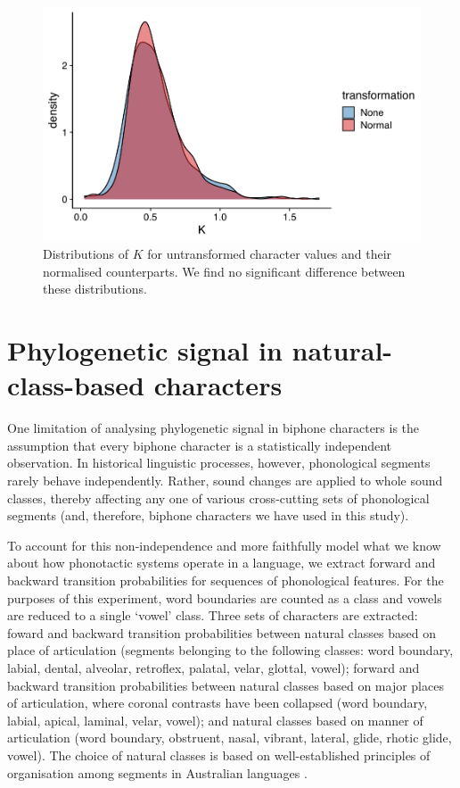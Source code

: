 \begin{figure}

{\centering \includegraphics[width=0.66\linewidth]{05-phylo-signal/fig/k-orig-norm} 

}

\caption{Distributions of $K$ for untransformed character values and their normalised counterparts. We find no significant difference between these distributions.}\label{fig:orig-vs-nrmlzd}
\end{figure}

\hypertarget{phy-sig-classes}{%
\section{Phylogenetic signal in natural-class-based characters}\label{phy-sig-classes}}

One limitation of analysing phylogenetic signal in biphone characters is the assumption that every biphone character is a statistically independent observation. In historical linguistic processes, however, phonological segments rarely behave independently. Rather, sound changes are applied to whole sound classes, thereby affecting any one of various cross-cutting sets of phonological segments (and, therefore, biphone characters we have used in this study).

To account for this non-independence and more faithfully model what we know about how phonotactic systems operate in a language, we extract forward and backward transition probabilities for sequences of phonological features. For the purposes of this experiment, word boundaries are counted as a class and vowels are reduced to a single `vowel' class. Three sets of characters are extracted: foward and backward transition probabilities between natural classes based on place of articulation (segments belonging to the following classes: word boundary, labial, dental, alveolar, retroflex, palatal, velar, glottal, vowel); forward and backward transition probabilities between natural classes based on major places of articulation, where coronal contrasts have been collapsed (word boundary, labial, apical, laminal, velar, vowel); and natural classes based on manner of articulation (word boundary, obstruent, nasal, vibrant, lateral, glide, rhotic glide, vowel). The choice of natural classes is based on well-established principles of organisation among segments in Australian languages \autocites{dixon_languages_1980}{hamilton_phonetic_1996}{baker_word_2014}{round_segment_2020}{round_phonotactics_2020}.

